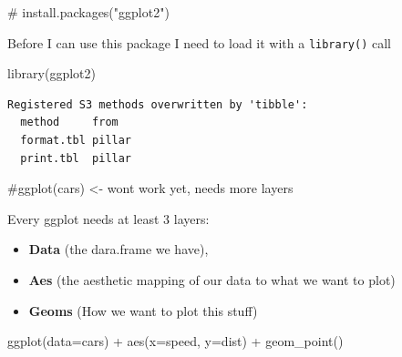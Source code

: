 \documentclass[
  letterpaper,
  DIV=11,
  numbers=noendperiod]{scrartcl}
\newenvironment{Shaded}{\begin{snugshade}}{\end{snugshade}}
\newcommand{\AttributeTok}[1]{\textcolor[rgb]{0.40,0.45,0.13}{#1}}
\newcommand{\CommentTok}[1]{\textcolor[rgb]{0.37,0.37,0.37}{#1}}
\newcommand{\FunctionTok}[1]{\textcolor[rgb]{0.28,0.35,0.67}{#1}}
\newcommand{\NormalTok}[1]{\textcolor[rgb]{0.00,0.23,0.31}{#1}}
\newcommand{\SpecialCharTok}[1]{\textcolor[rgb]{0.37,0.37,0.37}{#1}}
\providecommand{\tightlist}{%
  \setlength{\itemsep}{0pt}\setlength{\parskip}{0pt}}\usepackage{longtable,booktabs,array}
\begin{document}
\begin{Shaded}
\begin{Highlighting}[]
\CommentTok{\# install.packages("ggplot2")}
\end{Highlighting}
\end{Shaded}

Before I can use this package I need to load it with a
\texttt{library()} call

\begin{Shaded}
\begin{Highlighting}[]
\FunctionTok{library}\NormalTok{(ggplot2)}
\end{Highlighting}
\end{Shaded}

\begin{verbatim}
Registered S3 methods overwritten by 'tibble':
  method     from  
  format.tbl pillar
  print.tbl  pillar
\end{verbatim}

\begin{Shaded}
\begin{Highlighting}[]
\CommentTok{\#ggplot(cars) \textless{}{-} won\textquotesingle{}t work yet, needs more layers}
\end{Highlighting}
\end{Shaded}

Every ggplot needs at least 3 layers:

\begin{itemize}
\tightlist
\item
  \textbf{Data} (the dara.frame we have),
\item
  \textbf{Aes} (the aesthetic mapping of our data to what we want to
  plot)
\item
  \textbf{Geoms} (How we want to plot this stuff)
\end{itemize}

\begin{Shaded}
\begin{Highlighting}[]
\FunctionTok{ggplot}\NormalTok{(}\AttributeTok{data=}\NormalTok{cars) }\SpecialCharTok{+} 
  \FunctionTok{aes}\NormalTok{(}\AttributeTok{x=}\NormalTok{speed, }\AttributeTok{y=}\NormalTok{dist) }\SpecialCharTok{+} \FunctionTok{geom\_point}\NormalTok{()}
\end{Highlighting}
\end{Shaded}
\end{document}
